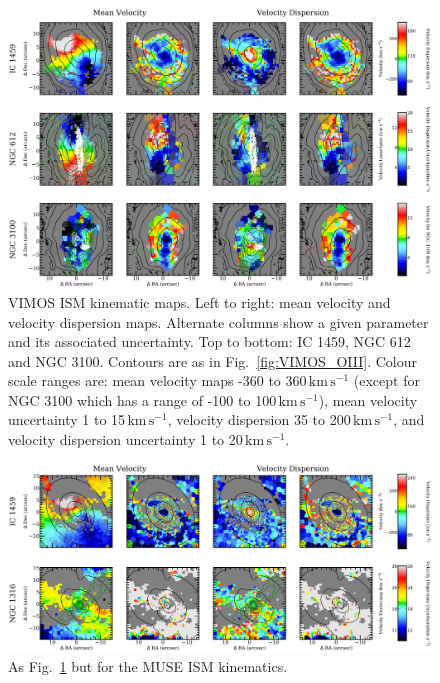 	\begin{figure}
		\centering
		\includegraphics[height=0.47\textheight]{chapter5/vimos/kin.png}
		\caption[VIMOS ISM kinematic maps]{VIMOS ISM kinematic maps. Left to right: mean velocity and velocity dispersion maps. Alternate columns show a given parameter and its associated uncertainty. Top to bottom: IC 1459, NGC 612 and NGC 3100. Contours are as in Fig.\ \ref{fig:VIMOS_OIII}. Colour scale ranges are: mean velocity maps -360 to 360\,$\mathrm{km \, s^{-1}}$ (except for NGC 3100 which has a range of -100 to 100\,$\mathrm{km \, s^{-1}}$), mean velocity uncertainty 1 to 15\,$\mathrm{km \, s^{-1}}$, velocity dispersion 35 to 200\,$\mathrm{km \, s^{-1}}$, and velocity dispersion uncertainty 1 to 20\,$\mathrm{km \, s^{-1}}$.} 
		\label{fig:VIMOS_Gaskine}
	\end{figure}

	\begin{figure}
		\centering
		\includegraphics[height=0.31\textheight]{chapter5/muse/kin.png}
		\caption[MUSE ISM kinematic maps]{As Fig.\ \ref{fig:VIMOS_Gaskine} but for the MUSE ISM kinematics.}
		\label{fig:MUSE_Gaskine}
	\end{figure}


